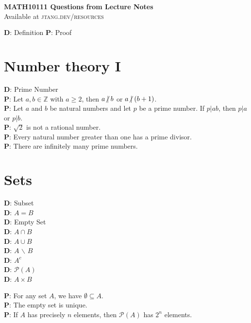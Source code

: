 \documentclass[a4paper]{article}
\begin{document}
	
\begin{center}
	\huge{\textbf{MATH10111 Questions from Lecture Notes}}\\
	\small{Available at \textsc{jtang.dev/resources}}\\
\end{center}
\begin{center}
	\textbf{D}: Definition\hspace{50pt} \textbf{P}: Proof
\end{center}

\section*{Number theory I}
	\textbf{D}: Prime Number\\
	\textbf{P}: Let $a, b \in \mathbb{Z}$ with $a \geq 2$, then $a \centernot\vert b$ or $a \centernot\vert (b+1)$.\\
	\textbf{P}: Let $a$ and $b$ be natural numbers and let $p$ be a prime number. If $p\vert ab$, then $p\vert a$ or $p\vert b$.\\
	\textbf{P}: $\sqrt{2}$ is not a rational number.\\
	\textbf{P}: Every natural number greater than one has a prime divisor.\\
	\textbf{P}: There are infinitely many prime numbers.

\section*{Sets}
\begin{multicols}{3}
	\noindent
	\textbf{D}: Subset\\
	\textbf{D}: $A=B$\\
	\textbf{D}: Empty Set\\
	\textbf{D}: $A \cap B$\\
	\textbf{D}: $A \cup B$\\
	\textbf{D}: $A$ $\backslash$ $B$\\
	\textbf{D}: $A^c$\\
	\textbf{D}: $\mathcal{P}(A)$\\
	\textbf{D}: $A \times B$
\end{multicols}
	\noindent
	\textbf{P}: For any set $A$, we have $\emptyset \subseteq A$.\\
	\textbf{P}: The empty set is unique.\\
	\textbf{P}: If $A$ has precisely $n$ elements, then $\mathcal{P}(A)$ has $2^n$ elements.
\end{document}
